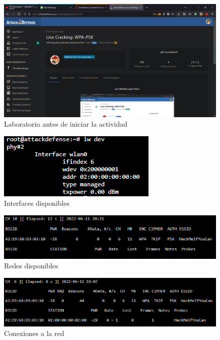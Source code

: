 \documentclass{article}
\begin{document}
        \begin{landscape}
            \begin{figure}[!h]
                \centering
                \includegraphics[scale=0.5]{img/wpa-breaking-before-evidence.png}
                \caption{Laboratorio antes de iniciar la actividad}
                \label{fig:wpa-before}
            \end{figure}
        \end{landscape}

        \clearpage
        \begin{figure}[!h]
            \centering
            \includegraphics[scale=1]{img/interface_wlan0.png}
            \caption{Interfaces disponibles}
            \label{fig:step2}
        \end{figure}

        \begin{figure}[!h]
            \centering
            \includegraphics[scale=0.8]{img/airodump.png}
            \caption{Redes disponibles}
            \label{fig:step3}
        \end{figure}

        \clearpage
        \begin{figure}[!h]
            \centering
            \includegraphics[scale=0.8]{img/-c6-wtest.png}
            \caption{Conexiones a la red}
            \label{fig:step4}
        \end{figure}
\end{document}

